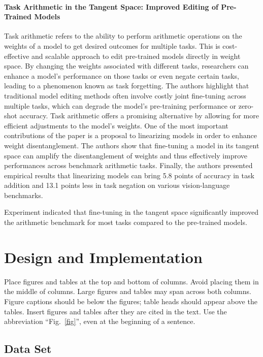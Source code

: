 \documentclass[conference]{IEEEtran}
\begin{document}
\paragraph{Task Arithmetic in the Tangent Space: Improved Editing of Pre-Trained Models} Task arithmetic refers to the ability to perform arithmetic operations on the weights of a model to get desired outcomes for multiple tasks. This is cost-effective and scalable approach to edit pre-trained models directly in weight space. By changing the weights associated with different tasks, researchers can enhance a model's performance on those tasks or even negate certain tasks, leading to a phenomenon known as task forgetting. The authors highlight that traditional model editing methods often involve costly joint fine-tuning across multiple tasks, which can degrade the model's pre-training performance or zero-shot accuracy. Task arithmetic offers a promising alternative by allowing for more efficient adjustments to the model's weights.
One of the most important contributions of the paper is a proposal to linearizing models in order to enhance weight disentanglement. The authors show that fine-tuning a model in its tangent space can amplify the disentanglement of weights and thus effectively improve performances across benchmark arithmetic tasks. Finally, the authors presented empirical results that linearizing models can bring 5.8 points of accuracy in task addition and 13.1 points less in task negation on various vision-language benchmarks.

Experiment indicated that fine-tuning in the tangent space significantly improved the arithmetic benchmark for most tasks compared to the pre-trained models. 



\section{Design and Implementation}
Place figures and tables at the top and 
bottom of columns. Avoid placing them in the middle of columns. Large 
figures and tables may span across both columns. Figure captions should be 
below the figures; table heads should appear above the tables. Insert 
figures and tables after they are cited in the text. Use the abbreviation 
``Fig.~\ref{fig}'', even at the beginning of a sentence.

\subsection{Data Set}
\end{document}
